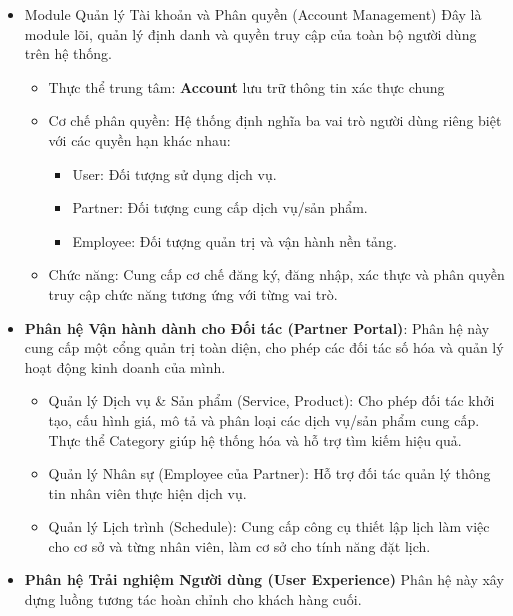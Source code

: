  \begin{itemize}
            \item Module Quản lý Tài khoản và Phân quyền (Account Management)
            Đây là module lõi, quản lý định danh và quyền truy cập của toàn bộ người dùng trên hệ thống.
            \begin{itemize}
                \item Thực thể trung tâm: \textbf{Account} lưu trữ thông tin xác thực chung
                \item Cơ chế phân quyền: Hệ thống định nghĩa ba vai trò người dùng riêng biệt với các quyền hạn khác nhau:
                \begin{itemize}
                    \item User: Đối tượng sử dụng dịch vụ.
                    \item Partner: Đối tượng cung cấp dịch vụ/sản phẩm.
                    \item Employee: Đối tượng quản trị và vận hành nền tảng.
                \end{itemize}
                \item Chức năng: Cung cấp cơ chế đăng ký, đăng nhập, xác thực và phân quyền truy cập chức năng tương ứng với từng vai trò.
            \end{itemize}
            \item \textbf{Phân hệ Vận hành dành cho Đối tác (Partner Portal)}: 
            Phân hệ này cung cấp một cổng quản trị toàn diện, cho phép các đối tác số hóa và quản lý hoạt động kinh doanh của mình.
            \begin{itemize}
                \item Quản lý Dịch vụ \& Sản phẩm (Service, Product): Cho phép đối tác khởi tạo, cấu hình giá, mô tả và phân loại các dịch vụ/sản phẩm cung cấp. Thực thể Category giúp hệ thống hóa và hỗ trợ tìm kiếm hiệu quả.
                \item Quản lý Nhân sự (Employee của Partner): Hỗ trợ đối tác quản lý thông tin nhân viên thực hiện dịch vụ.
                \item Quản lý Lịch trình (Schedule): Cung cấp công cụ thiết lập lịch làm việc cho cơ sở và từng nhân viên, làm cơ sở cho tính năng đặt lịch.
            \end{itemize}
        \item \textbf{Phân hệ Trải nghiệm Người dùng (User Experience)} Phân hệ này xây dựng luồng tương tác hoàn chỉnh cho khách hàng cuối.
            \begin{itemize}

\end{itemize}
\end{itemize}
